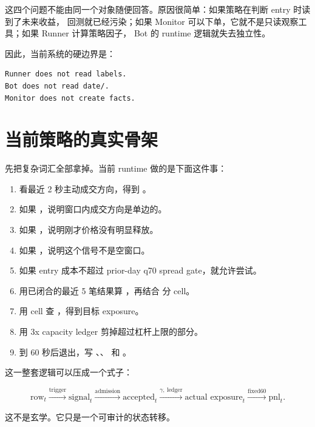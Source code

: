 这四个问题不能由同一个对象随便回答。原因很简单：如果策略在判断 entry 时读到了未来收益，
回测就已经污染；如果 Monitor 可以下单，它就不是只读观察工具；如果 Runner 计算策略因子，
Bot 的 runtime 逻辑就失去独立性。

因此，当前系统的硬边界是：

\begin{lstlisting}
Runner does not read labels.
Bot does not read date/.
Monitor does not create facts.
\end{lstlisting}


\section{当前策略的真实骨架}

先把复杂词汇全部拿掉。当前 runtime 做的是下面这件事：

\begin{enumerate}[leftmargin=2em]
  \item 看最近 2 秒主动成交方向，得到 。
  \item 如果 ，说明窗口内成交方向是单边的。
  \item 如果 ，说明刚才价格没有明显释放。
  \item 如果 ，说明这个信号不是空窗口。
  \item 如果 entry 成本不超过 prior-day q70 spread gate，就允许尝试。
  \item 用已闭合的最近 5 笔结果算 ，再结合  分 cell。
  \item 用 cell 查 ，得到目标 exposure。
  \item 用 3x capacity ledger 剪掉超过杠杆上限的部分。
  \item 到 60 秒后退出，写 、、 和 。
\end{enumerate}

这一整套逻辑可以压成一个式子：

\[
\text{row}_t
\xrightarrow{\text{trigger}}
\text{signal}_t
\xrightarrow{\text{admission}}
\text{accepted}_t
\xrightarrow{\gamma,\ \text{ledger}}
\text{actual exposure}_t
\xrightarrow{\text{fixed60}}
\text{pnl}_t .
\]

这不是玄学。它只是一个可审计的状态转移。

